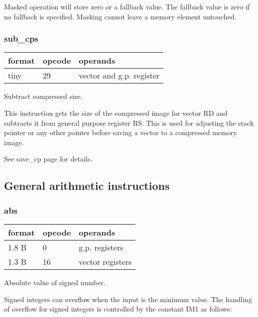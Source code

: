 \documentclass[forwardcom.tex]{subfiles}
\begin{document}
Masked operation will store zero or a fallback value. 
The fallback value is zero if no fallback is specified. Masking cannot leave a memory element untouched.

\subsubsection{sub\_cps}
\label{table:subCpsInstruction}
\begin{tabular}{|p{12mm}|p{12mm}|p{110mm}|}
\hline
\bfseries format & \bfseries opcode & \bfseries operands \\ \hline
tiny & 29 & vector and g.p. register \\ \hline
\end{tabular}
\vspace{2mm}

Subtract compressed size.
\vspace{2mm}

This instruction gets the size of the compressed image for vector RD and subtracts it from general purpose register RS.
This is used for adjusting the stack pointer or any other pointer
before saving a vector to a compressed memory image.
\vspace{2mm}

See save\_cp page \pageref{table:saveCpInstruction} for details.

\subsection{General arithmetic instructions}

\subsubsection{abs}
\label{table:absInstruction}
\begin{tabular}{|p{12mm}|p{12mm}|p{110mm}|}
\hline
\bfseries format & \bfseries opcode & \bfseries operands \\ \hline
1.8 B &  0 & g.p. registers \\ \hline
1.3 B & 16 & vector registers \\ \hline
\end{tabular}
\vspace{2mm}

Absolute value of signed number.
\vspace{2mm}

Signed integers can overflow when the input is the minimum value.
The handling of overflow for signed integers is controlled by the constant IM1 as follows:
\end{document}
